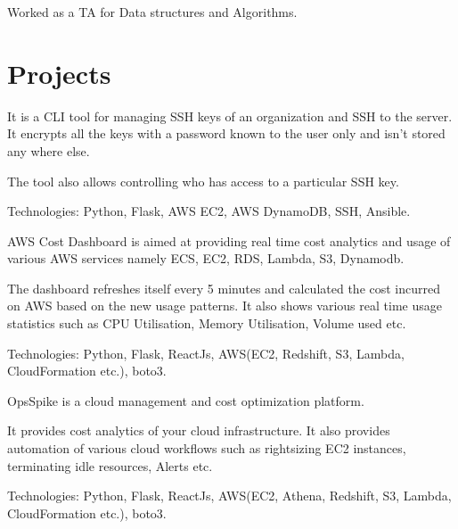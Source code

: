 \documentclass[]{main}
\begin{document}
\begin{minipage}[t]{0.60\textwidth}
\begin{tightemize}
\item Worked as a TA for Data structures and Algorithms.
\end{tightemize}
\sectionsep


\section{Projects}
\begin{tightemize}
\item It is a CLI tool for managing SSH keys of an organization and SSH to the server. It encrypts all the keys with a password known to the user only and isn't stored any where else.
\item The tool also allows controlling who has access to a particular SSH key.
\item Technologies: Python, Flask, AWS EC2, AWS DynamoDB, SSH, Ansible.
\end{tightemize}
\sectionsep

\begin{tightemize}
\item AWS Cost Dashboard is aimed at providing real time cost analytics and usage of various AWS services namely ECS, EC2, RDS, Lambda, S3, Dynamodb.
\item The dashboard refreshes itself every 5 minutes and calculated the cost incurred on AWS based on the new usage patterns. It also shows various real time usage statistics such as CPU Utilisation, Memory Utilisation, Volume used etc.
\item Technologies: Python, Flask, ReactJs, AWS(EC2, Redshift, S3, Lambda, CloudFormation etc.), boto3.
\end{tightemize}
\sectionsep

\begin{tightemize}
\item OpsSpike is a cloud management and cost optimization platform.
\item It provides cost analytics of your cloud infrastructure. It also provides automation of various cloud workflows such as rightsizing EC2 instances, terminating idle resources, Alerts etc.
\item Technologies: Python, Flask, ReactJs, AWS(EC2, Athena, Redshift, S3, Lambda, CloudFormation etc.), boto3.
\end{tightemize}
\sectionsep


\end{minipage}
\end{document}
